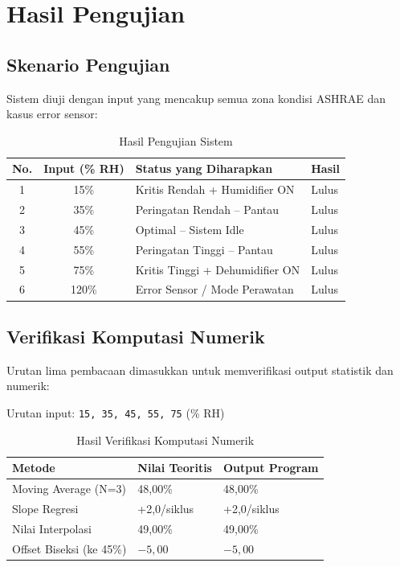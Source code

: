 \documentclass[journal]{IEEEtran}
\begin{document}
\section{Hasil Pengujian}

\subsection{Skenario Pengujian}
Sistem diuji dengan input yang mencakup semua zona kondisi ASHRAE dan kasus error sensor:

\begin{table}[H]
  \centering
  \caption{Hasil Pengujian Sistem}
  \begin{tabular}{@{}ccll@{}}
    \toprule
    \textbf{No.} & \textbf{Input (\% RH)} & \textbf{Status yang Diharapkan} & \textbf{Hasil} \\
    \midrule
    1 & 15\%  & Kritis Rendah + Humidifier ON   & Lulus \\
    2 & 35\%  & Peringatan Rendah -- Pantau     & Lulus \\
    3 & 45\%  & Optimal -- Sistem Idle          & Lulus \\
    4 & 55\%  & Peringatan Tinggi -- Pantau     & Lulus \\
    5 & 75\%  & Kritis Tinggi + Dehumidifier ON & Lulus \\
    6 & 120\% & Error Sensor / Mode Perawatan   & Lulus \\
    \bottomrule
  \end{tabular}
\end{table}

\subsection{Verifikasi Komputasi Numerik}
Urutan lima pembacaan dimasukkan untuk memverifikasi output statistik dan numerik:

\noindent Urutan input: \texttt{15, 35, 45, 55, 75} (\% RH)

\begin{table}[H]
  \centering
  \caption{Hasil Verifikasi Komputasi Numerik}
  \begin{tabular}{@{}lll@{}}
    \toprule
    \textbf{Metode} & \textbf{Nilai Teoritis} & \textbf{Output Program} \\
    \midrule
    Moving Average (N=3)     & 48,00\%      & 48,00\% \\
    Slope Regresi            & +2,0/siklus  & +2,0/siklus \\
    Nilai Interpolasi        & 49,00\%      & 49,00\% \\
    Offset Biseksi (ke 45\%) & $-5,00$      & $-5,00$ \\
    \bottomrule
  \end{tabular}
\end{table}
\end{document}
